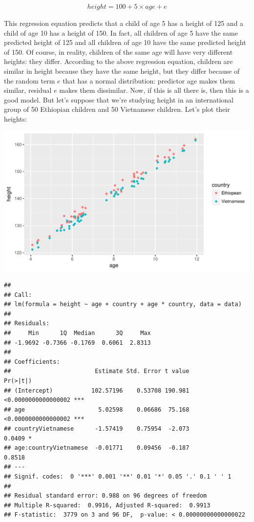 \documentclass[]{report}\usepackage[]{graphicx}\usepackage[]{color}
\makeatletter
\def\maxwidth{ %
  \ifdim\Gin@nat@width>\linewidth
    \linewidth
  \else
    \Gin@nat@width
  \fi
}
\newenvironment{kframe}{%
 \def\at@end@of@kframe{}%
 \ifinner\ifhmode%
  \def\at@end@of@kframe{\end{minipage}}%
  \begin{minipage}{\columnwidth}%
 \fi\fi%
 \def\FrameCommand##1{\hskip\@totalleftmargin \hskip-\fboxsep
 \colorbox{shadecolor}{##1}\hskip-\fboxsep
     \hskip-\linewidth \hskip-\@totalleftmargin \hskip\columnwidth}%
 \MakeFramed {\advance\hsize-\width
   \@totalleftmargin\z@ \linewidth\hsize
   \@setminipage}}%
 {\par\unskip\endMakeFramed%
 \at@end@of@kframe}
\newenvironment{knitrout}{}{} %
\makeatother
\begin{document}
\begin{eqnarray}
height = 100 + 5 \times age + e
\end{eqnarray}

This regression equation predicts that a child of age 5 has a height of 125 and a child of age 10 has a height of 150. In fact, all children of age 5 have the same predicted height of 125 and all children of age 10 have the same predicted height of 150. Of course, in reality, children of the same age will have very different heights: they differ. According to the above regression equation, children are similar in height because they have the same height, but they differ because of the random term $e$ that has a normal distribution: predictor age makes them similar, residual $e$ makes them dissimilar. Now, if this is all there is, then this is a good model. But let's suppose that we're studying height in an international group of 50 Ethiopian children and 50 Vietnamese children. Let's plot their heights:


\begin{knitrout}
\color{fgcolor}

{\centering \includegraphics[width=\maxwidth]{figure/fig14-1} 

}


\begin{kframe}\begin{verbatim}
## 
## Call:
## lm(formula = height ~ age + country + age * country, data = data)
## 
## Residuals:
##     Min      1Q  Median      3Q     Max 
## -1.9692 -0.7366 -0.1769  0.6061  2.8313 
## 
## Coefficients:
##                        Estimate Std. Error t value            Pr(>|t|)    
## (Intercept)           102.57196    0.53708 190.981 <0.0000000000000002 ***
## age                     5.02598    0.06686  75.168 <0.0000000000000002 ***
## countryVietnamese      -1.57419    0.75954  -2.073              0.0409 *  
## age:countryVietnamese  -0.01771    0.09456  -0.187              0.8518    
## ---
## Signif. codes:  0 '***' 0.001 '**' 0.01 '*' 0.05 '.' 0.1 ' ' 1
## 
## Residual standard error: 0.988 on 96 degrees of freedom
## Multiple R-squared:  0.9916,	Adjusted R-squared:  0.9913 
## F-statistic:  3779 on 3 and 96 DF,  p-value: < 0.00000000000000022
\end{verbatim}
\end{kframe}
\end{knitrout}
\end{document}
